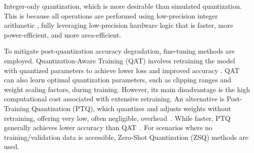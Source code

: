 
Integer-only quantization, which is more desirable than simulated quantization. This is because all operations are performed using low-precision integer arithmetic \cite{gholami2021surveyquantizationmethodsefficient}, fully leveraging low-precision hardware logic that is faster, more power-efficient, and more area-efficient.

To mitigate post-quantization accuracy degradation, fine-tuning methods are employed. Quantization-Aware Training (QAT) involves retraining the model with quantized parameters to achieve lower loss and improved accuracy \cite{gholami2021surveyquantizationmethodsefficient}. QAT can also learn optimal quantization parameters, such as clipping ranges and weight scaling factors, during training. However, its main disadvantage is the high computational cost associated with extensive retraining. An alternative is Post-Training Quantization (PTQ), which quantizes and adjusts weights without retraining, offering very low, often negligible, overhead~\cite{gholami2021surveyquantizationmethodsefficient}. While faster, PTQ generally achieves lower accuracy than QAT~\cite{gholami2021surveyquantizationmethodsefficient}. For scenarios where no training/validation data is accessible, Zero-Shot Quantization (ZSQ) methods are used.


